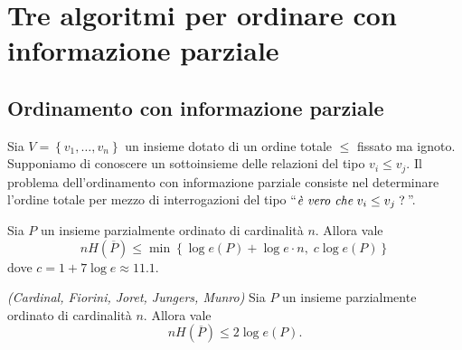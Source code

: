 \chapter{Tre algoritmi per ordinare con informazione parziale}

\section{Ordinamento con informazione parziale} Sia \(V=\left\{v_1,\dots,v_n\right\}\) un insieme dotato di un ordine totale \(\le\) fissato ma ignoto. Supponiamo di conoscere un sottoinsieme delle relazioni del tipo \(v_i\le v_j\). Il problema dell'ordinamento con informazione parziale consiste nel determinare l'ordine totale per mezzo di interrogazioni del tipo ``\(\text{\emph{è vero che}}\;v_i\le v_j\;\text{?}\,\)''. 
\begin{theorem}
	 Sia \(P\) un insieme parzialmente ordinato di cardinalità \(n\). Allora vale
	\[nH\left(\overline{P}\right)\le\min\left\{\log{e(P)}+\log{e\cdot n},\; c\log{e(P)}\right\}\]
	dove \(c=1+7\log{e}\approx 11.1\). 
\end{theorem}
\begin{theorem}
	\label{cfjjmtheorem} \emph{(Cardinal, Fiorini, Joret, Jungers, Munro)} Sia \(P\) un insieme parzialmente ordinato di cardinalità \(n\). Allora vale
	\[nH\left(\overline{P}\right)\le 2\log{e(P)}.\]
\end{theorem}
